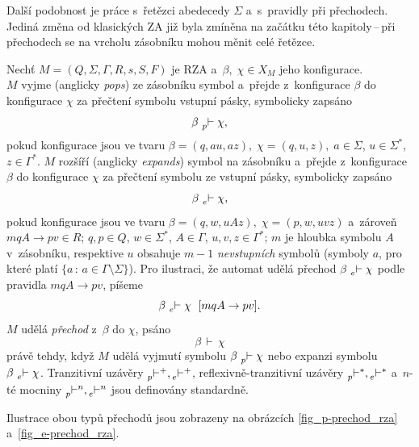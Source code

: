 Další podobnost je práce s~řetězci abedecedy $\Sigma$ a~s~pravidly při přechodech. 
Jediná změna od klasických ZA již byla zmíněna na začátku této kapitoly\,--\,při přechodech se na vrcholu zásobníku mohou měnit celé řetězce.

\begin{definition}\label{def_prechod_rza}
    Nechť $M = (Q, \Sigma, \Gamma, R, s, S, F)$ je RZA a~$\beta,\; \chi \in X_M$ jeho konfigurace.\\
    $M$ vyjme (anglicky \emph{pops}) ze zásobníku symbol a~přejde z~konfigurace $\beta$ do konfigurace $\chi$ za přečtení symbolu vstupní pásky, symbolicky zapsáno
    \begin{equation*}
        \beta\, \prescript{}{p}{\vdash}\; \chi,
    \end{equation*}
    pokud konfigurace jsou ve tvaru $\beta = (q, au, az),\; \chi = (q, u, z),\; a \in \Sigma$, $u \in \Sigma^*$, ${z \in \Gamma^*}$.
    $M$ rozšíří (anglicky \emph{expands}) symbol na zásobníku a~přejde z~konfigurace $\beta$ do konfigurace $\chi$ za přečtení symbolu ze vstupní pásky, symbolicky zapsáno
    \begin{equation*}
        \beta\, \prescript{}{e}{\vdash}\; \chi,
    \end{equation*} 
    pokud konfigurace jsou ve tvaru $\beta = (q, w, uAz),\; \chi = (p, w, uvz)$ a~zároveň $mqA \rightarrow pv \in R$; $q, p \in Q$, $w \in \Sigma^*$, $A \in \Gamma$, $u, v, z \in \Gamma^*$; $m$ je hloubka symbolu $A$ v~zásobníku, respektive $u$ obsahuje $m-1$ \emph{nevstupních} symbolů (symboly $a$, pro které platí $\{a\, :\, a \in \Gamma \setminus \Sigma\}$). 
    Pro ilustraci, že automat udělá přechod $\beta\, \prescript{}{e}{\vdash}\; \chi$ podle pravidla $mqA \rightarrow pv$, píšeme
     \begin{equation*}
        \beta\, \prescript{}{e}{\vdash}\; \chi \ \; [mqA \rightarrow pv].
    \end{equation*}
    $M$ udělá \emph{přechod} z~$\beta$ do $\chi$, psáno
    \begin{equation*}
        \beta\, \vdash\, \chi
    \end{equation*}
    právě tehdy, když $M$ udělá vyjmutí symbolu $\beta\, \prescript{}{p}{\vdash}\; \chi$ nebo expanzi symbolu $\beta\, \prescript{}{e}{\vdash}\; \chi$.
    Tranzitivní uzávěry $\prescript{}{p}{\vdash^+}, \prescript{}{e}{\vdash^+}$, reflexivně-tranzitivní uzávěry $\prescript{}{p}{\vdash^*}, \prescript{}{e}{\vdash^*}$ a~$n$-té mocniny $\prescript{}{p}{\vdash^n}, \prescript{}{e}{\vdash^n}$ jsou definovány standardně.
\end{definition}
Ilustrace obou typů přechodů jsou zobrazeny na obrázcích \ref{fig_p-prechod_rza} a~\ref{fig_e-prechod_rza}.

